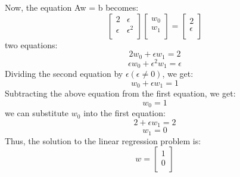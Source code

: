\documentclass{article}
\begin{document}
Now, the equation Aw = b becomes:
\[
\begin{bmatrix}
    2 & \epsilon \\
    \epsilon & \epsilon^{2} \\
\end{bmatrix}
\begin{bmatrix}
    w_{0} \\
    w_{1} \\
\end{bmatrix}
=
\begin{bmatrix}
    2 \\
    \epsilon \\
\end{bmatrix}
\]
two equations:
\[
    2w_{0} + \epsilon w_{1} = 2
\]
\[
    \epsilon w_{0} + \epsilon^{2} w_{1} = \epsilon
\]
Dividing the second equation by $\epsilon (\epsilon \neq 0)$, we get:
\[
    w_{0} + \epsilon w_{1} = 1
\]
Subtracting the above equation from the first equation, we get:
\[
    w_{0} = 1
\]
we can substitute $w_{0}$ into the first equation:
\[
    2 + \epsilon w_{1} = 2
\]
\[
    w_{1} = 0
\]
Thus, the solution to the linear regression problem is:
\[
    w = \begin{bmatrix}
        1 \\
        0 \\
    \end{bmatrix}
\]
\end{document}
